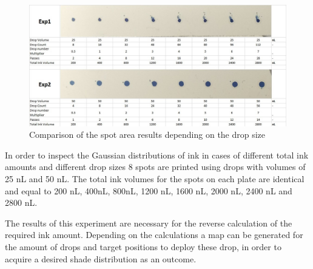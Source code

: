 \begin{figure}[H]
	\centering
	\includegraphics[width=1\textwidth]{grafiken/psfprint.jpg}
	\caption{Comparison of the spot area results depending on the drop size}
	\label{fig:psfprint}
\end{figure} 

\bigskip

In order to inspect the Gaussian distributions of ink in cases of different total ink amounts and different drop sizes 8 spots are printed using drops with volumes of 25 nL and 50 nL. The total ink volumes for the spots on each plate are identical and equal to 200 nL, 400nL, 800nL, 1200 nL, 1600 nL, 2000 nL, 2400 nL and 2800 nL.

The results of this experiment are necessary for the reverse calculation of the required ink amount. Depending on the calculations a map can be generated for the amount of drops and target positions to deploy these drop, in order to acquire a desired shade distribution as an outcome.   